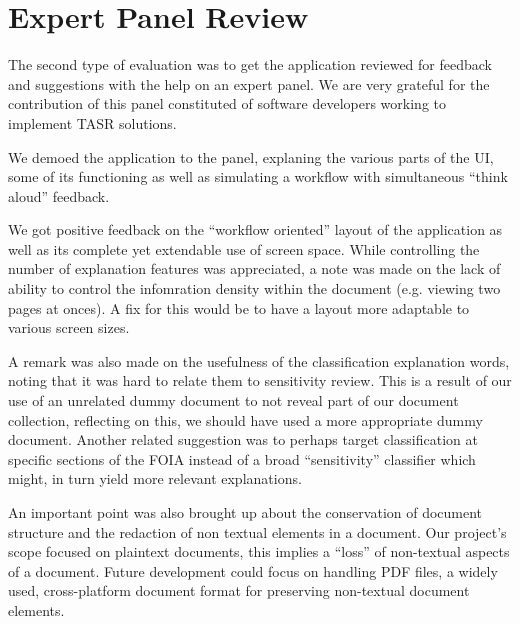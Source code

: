 \documentclass[\version]{l4proj}
\begin{document}
\section{Expert Panel Review}

The second type of evaluation was to get the application reviewed for feedback and suggestions with the help on an expert panel.
We are very grateful for the contribution of this panel constituted of software developers working to implement TASR solutions.

We demoed the application to the panel, explaning the various parts of the UI, some of its functioning as well as simulating a workflow with simultaneous ``think aloud'' feedback.

We got positive feedback on the ``workflow oriented'' layout of the application as well as its complete yet extendable use of screen space.
While controlling the number of explanation features was appreciated, a note was made on the lack of ability to control the infomration density within the document (e.g. viewing two pages at onces).
A fix for this would be to have a layout more adaptable to various screen sizes. %

A remark was also made on the usefulness of the classification explanation words, noting that it was hard to relate them to sensitivity review.
This is a result of our use of an unrelated dummy document to not reveal part of our document collection, reflecting on this, we should have used a more appropriate dummy document.
Another related suggestion was to perhaps target classification at specific sections of the FOIA instead of a broad ``sensitivity'' classifier which might, in turn yield more relevant explanations.

An important point was also brought up about the conservation of document structure and the redaction of non textual elements in a document.
Our project's scope focused on plaintext documents, this implies a ``loss'' of non-textual aspects of a document.
Future development could focus on handling PDF files, a widely used, cross-platform document format for preserving non-textual document elements.


\end{document}
